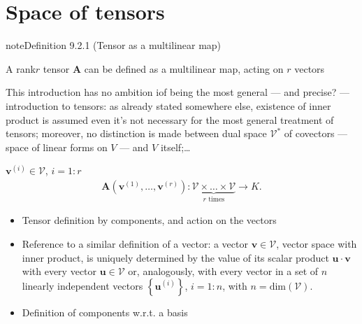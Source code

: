 \documentclass[letterpaper,10pt,english]{jupyterBook}
\begin{document}
\section{Space of tensors}
\label{\detokenize{ch/tensor-algebra-calculus/algebra:space-of-tensors}}\label{ch/tensor-algebra-calculus/algebra:def-tensor}
\begin{sphinxadmonition}{note}{Definition 9.2.1 (Tensor as a multilinear map)}



\sphinxAtStartPar
A rank\sphinxhyphen{}\(r\) tensor \(\mathbf{A}\) can be defined as a multilinear map, acting on \(r\) vectors%
\begin{footnote}[1]\sphinxAtStartFootnote
This introduction has no ambition iof being the most general — and precise? — introduction to tensors: as already stated somewhere else, existence of inner product is assumed even it’s not necessary for the most general treatment of tensors; moreover, no distinction is made between dual space \(\mathscr{V}^*\) of covectors — space of linear forms on \(V\) — and \(V\) itself;…
%
\end{footnote} \(\mathbf{v}^{(i)} \in \mathscr{V}\), \(i = 1:r\)
\begin{equation*}
\begin{split}\mathbf{A}\left(\mathbf{v}^{(1)}, \dots, \mathbf{v}^{(r)}\right): \underbrace{\mathscr{V} \times \dots \times \mathscr{V}}_{\text{$r$ times}} \rightarrow K .\end{split}
\end{equation*}\end{sphinxadmonition}

\sphinxAtStartPar
{}
\begin{itemize}
\item {} 
\sphinxAtStartPar
Tensor definition by components, and action on the vectors

\item {} 
\sphinxAtStartPar
Reference to a similar definition of a vector: a vector \(\mathbf{v} \in \mathscr{V}\), vector space with inner product, is uniquely determined by the value of its scalar product \(\mathbf{u} \cdot \mathbf{v}\) with every vector \(\mathbf{u} \in \mathscr{V}\) or, analogously, with every vector in a set of \(n\) linearly independent vectors \(\left\{ \mathbf{u}^{(i)} \right\}\), \(i = 1:n\), with \(n= \text{dim}\left( \mathscr{V} \right)\).

\item {} 
\sphinxAtStartPar
Definition of components w.r.t. a basis

\end{itemize}
\end{document}
